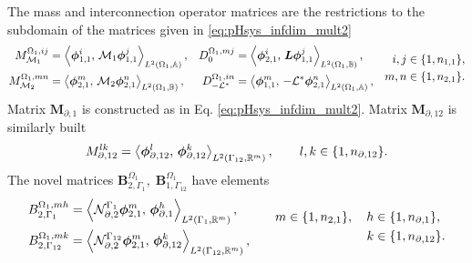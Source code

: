 The mass and interconnection operator matrices are the restrictions to the subdomain of the matrices given in \eqref{eq:pHsys_infdim_mult2}
\begin{equation}
\begin{aligned}
{M}_{\mathcal{M}_1}^{\Omega_1, ij} &= \inner[L^2(\Omega_1, \mathbb{A})]{\bm{\phi}_{1, 1}^i}{\mathcal{M}_1\bm{\phi}_{1, 1}^j}, \\
{M}_{\mathcal{M}_2}^{\Omega_1, mn} &= \inner[L^2(\Omega_1, \mathbb{B})]{\bm{\phi}_{2, 1}^m}{\mathcal{M}_2\bm{\phi}_{2, 1}^n}, 
\end{aligned} \quad 
\begin{aligned}
{D}_{0}^{\Omega_1, mj} &= \inner[L^2(\Omega_1, \mathbb{B})]{\bm{\phi}_{2, 1}^i}{\bm{L}\bm{\phi}_{1, 1}^j}, \\
{D}_{-\mathcal{L}^*}^{\Omega_1, in} &= \inner[L^2(\Omega_1, \mathbb{A})]{\bm{\phi}_{1, 1}^m}{-\mathcal{L}^*\bm{\phi}_{2, 1}^n}, 
\end{aligned} \quad
\begin{aligned}
i,j &\in \{1,n_{1, 1}\}, \\
m,n &\in \{1,n_{2, 1}\}.
\end{aligned}
\end{equation} 
Matrix $\mathbf{M}_{\partial, 1}$ is constructed as in Eq. \eqref{eq:pHsys_infdim_mult2}. Matrix $\mathbf{M}_{\partial, 12}$ is similarly built 
\begin{equation}
{M}_{\partial, 12}^{lk} =\inner[L^2(\Gamma_{12}, \mathbb{R}^m)]{\bm{\phi}_{\partial, 12}^l}{\bm{\phi}_{\partial, {12}}^k}, \qquad l,k \in \{1,n_{\partial, 12}\}.
\end{equation}
The novel matrices  $\mathbf{B}_{2, \Gamma_1}^{\Omega_1}, \; \mathbf{B}_{1, \Gamma_{12}}^{\Omega_1}$ have elements
\begin{equation}
\begin{aligned}
{B}_{2, \Gamma_1}^{\Omega_1, mh} &= \inner[L^2(\Gamma_{1}, \mathbb{R}^m)]{\mathcal{N}_{\partial, 2}^{\Gamma_1}\bm{\phi}_{2, 1}^m}{\bm{\phi}_{\partial, 1}^h}, \\
{B}_{2, \Gamma_{12}}^{\Omega_1, mk} &= \inner[L^2(\Gamma_{12}, \mathbb{R}^m)]{\mathcal{N}_{\partial, 2}^{\Gamma_{12}}\bm{\phi}_{2, 1}^m}{\bm{\phi}_{\partial, 12}^k}, 
\end{aligned} \qquad 
\begin{aligned}
m \in \{1,n_{2, 1}\}, \quad h &\in \{1,n_{\partial, 1}\}, \\
k &\in \{1,n_{\partial, 12}\}.
\end{aligned}
\end{equation} 


